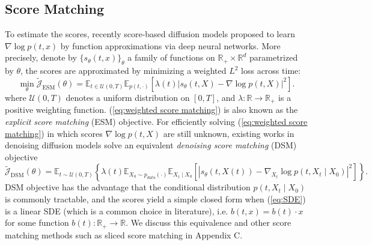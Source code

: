 \documentclass[letterpaper,10pt,reqno]{amsart}
\def\eqref#1{(\ref{#1})}
\numberwithin{equation}{section}
\begin{document}
\subsection{Score Matching} To estimate the scores, recently score-based diffusion models \cite{Song19, Song20}
proposed to learn $\nabla \log p(t,x)$ by function approximations via deep neural networks. 
More precisely, 
denote by $\{s_\theta(t,x)\}_\theta$ a family of functions on $\mathbb{R}_+ \times \mathbb{R}^d$
parametrized by $\theta$, the scores are approximated by minimizing a weighted $L^2$ loss across time:
\begin{equation}
\label{eq:weighted score matching}
\min_\theta \tilde{\mathcal{J}}_{\text{ESM}}(\theta) = \mathbb{E}_{t \in \mathcal{U}(0, T)}\mathbb{E}_{p(t, \cdot)} \left[\lambda(t)|s_\theta(t,X) - \nabla \log p(t,X)|^2\right].
\end{equation}
where $\mathcal{U}(0, T)$ denotes a uniform distribution on $[0, T]$, and $\lambda: \mathbb{R} \rightarrow \mathbb{R}_{+}$ is a positive weighting function. 
\eqref{eq:weighted score matching} is also known as the {\em explicit score matching} (ESM) objective. For efficiently solving \eqref{eq:weighted score matching} in which scores $\nabla \log p(t,X)$ are still unknown, existing works in denoising diffusion models \cite{Song20,karras2022elucidating} solve an equivalent {\em denoising score matching} (DSM) objective
$$
\tilde{\mathcal{J}}_{\text{DSM}}(\theta)=\mathbb{E}_{t\sim\mathcal{U}(0, T)}\left\{\lambda(t) \mathbb{E}_{X_0\sim p_{data}(\cdot)} \mathbb{E}_{X_t \mid X_0}\left[\left|s_{\theta}(t,X(t))-\nabla_{X_t} \log p(t,X_t \mid X_0)\right|^2\right]\right\}.
$$
DSM objective has the advantage that the conditional distribution $p(t,X_t\mid X_0)$ is commonly tractable, and the scores yield a simple closed form when \eqref{eq:SDE} is a linear SDE (which is a common choice in literature), i.e. $b(t,x)=b(t)\cdot x$ for some function $b(t):\mathbb{R}_{+}\rightarrow \mathbb{R}$. We discuss this equivalence and other score matching methods such as sliced score matching \cite{Song20sl} in Appendix C.
\end{document}

